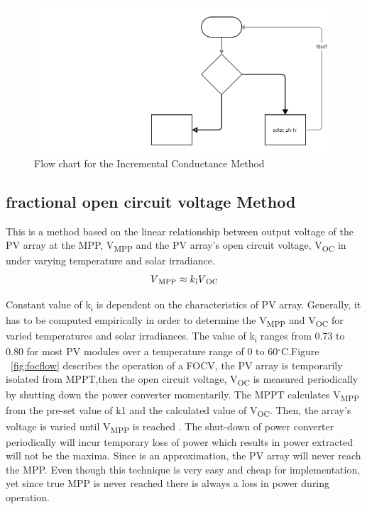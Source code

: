 {   \begin{figure}[H]
      \begin{center}
      \includegraphics[width=\textwidth]{images/pno_flow}
      \caption{ Flow chart for the Incremental Conductance Method}
      \label{fig:inCflow}
      \end{center}
      \end{figure}
  \subsection{fractional open circuit voltage Method }
  This is a method based on the linear relationship between output voltage of the PV array at the \ac{MPP}, V\textsubscript{MPP} and the PV array's open circuit voltage, V\textsubscript{OC} in under varying temperature and solar irradiance. \\
  
  \begin{equation}
    \begin{aligned}
  V\textsubscript{MPP}\approx k\textsubscript{i}V\textsubscript{OC}
  \label{eq:equ_fracoc}
  \end{aligned}
  \end{equation}
  
  Constant value of k\textsubscript{i} is dependent on the characteristics of PV array. Generally, it has to be computed empirically in order to determine the V\textsubscript{MPP} and V\textsubscript{OC} for varied temperatures and solar irradiances. The value of k\textsubscript{i} ranges from 0.73 to 0.80  for most PV modules over a temperature range of 0 to 60$^\circ$C.Figure ~\ref{fig:focflow} describes the operation of a \ac{FOCV}, the PV array is temporarily isolated from \ac{MPPT},then the open circuit voltage, V\textsubscript{OC} is measured periodically by shutting down the power converter momentarily. The \ac{MPPT} calculates V\textsubscript{MPP} from the pre-set value of k1 and the calculated value of V\textsubscript{OC}. Then, the array's voltage is varied until V\textsubscript{MPP} is  reached . The shut-down of power converter periodically will incur temporary loss of power which results in power extracted will not be the maxima. Since is an approximation, the PV array will never reach the \ac{MPP}. Even though this technique is very easy and cheap for implementation, yet since true \ac{MPP} is never reached there is always a loss in power during operation\cite{ngan2011study}.
  
}
